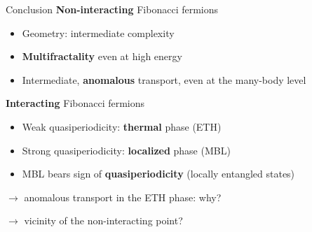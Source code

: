 \begin{frame}{Conclusion}
\textbf{Non-interacting} Fibonacci fermions
\begin{itemize}
	\item Geometry: intermediate complexity
	\item \textbf{Multifractality} even at high energy
	\item Intermediate, \textbf{anomalous} transport, even at the many-body level
\end{itemize}
\textbf{Interacting} Fibonacci fermions
\begin{itemize}
	\item Weak quasiperiodicity: \textcolor{comp}{\textbf{thermal} phase (ETH)}
	\item Strong quasiperiodicity: \textcolor{BostonBlue}{\textbf{localized} phase (MBL)}
	\item MBL bears sign of \textbf{quasiperiodicity} (locally entangled states)
\end{itemize}

$\to$ anomalous transport in the ETH phase: why?

$\to$ vicinity of the non-interacting point?

{}
\end{frame}
